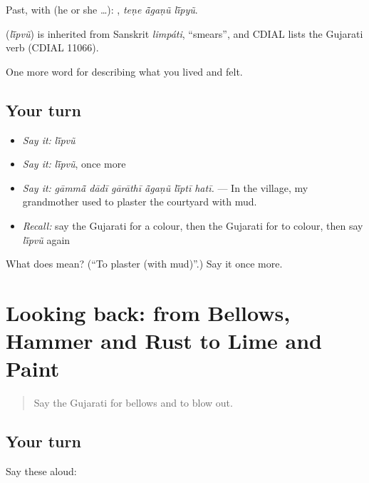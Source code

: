Past, with  (he or she …):   , \emph{teṇe ā̃gaṇũ lī̃pyũ}.

\begin{cousinweb}
\textbf{} (\emph{lī̃pvũ}) is inherited from Sanskrit \emph{limpáti}, \textquotedblleft{}smears\textquotedblright{}, and CDIAL lists the Gujarati verb (CDIAL 11066).
\end{cousinweb}

\begin{grammarlens}[title={What you've built}]
One more word for describing what you lived and felt.
\end{grammarlens}

\subsection*{Your turn}
\begin{itemize}
\raggedright
  \item \emph{Say it:} \emph{lī̃pvũ}
  \item \emph{Say it:} \emph{lī̃pvũ}, once more
  \item \emph{Say it:} \emph{gāmmā̃ dādī gārāthī ā̃gaṇũ lī̃ptī hatī.} — In the village, my grandmother used to plaster the courtyard with mud.
  \item \emph{Recall:} say the Gujarati for a colour, then the Gujarati for to colour, then say \emph{lī̃pvũ} again
\end{itemize}

\begin{tcolorbox}[breakable,colback=teal!4,colframe=teal!35!black,title={Before you move on}]
What does  mean? (\textquotedblleft{}To plaster (with mud)\textquotedblright{}.) Say it once more.
\end{tcolorbox}
\section[(dialogue)]{Looking back: from Bellows, Hammer and Rust to Lime and Paint}

\label{lesson:GU-R516-review-509-516}



\begin{quote}
Say the Gujarati for bellows and to blow out.
\end{quote}

\subsection*{Your turn}
Say these aloud:

